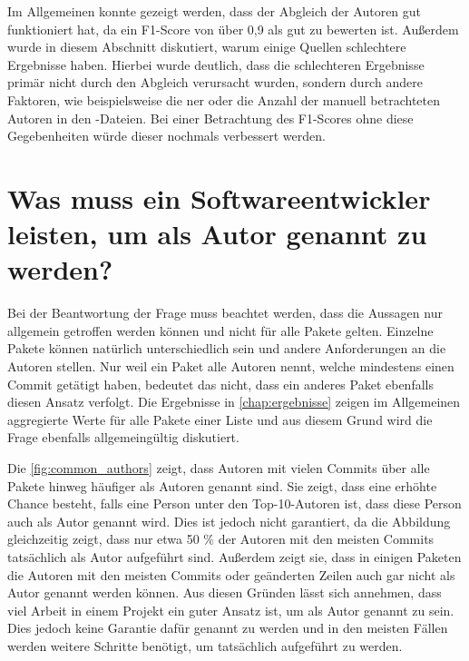 Im Allgemeinen konnte gezeigt werden, dass der Abgleich der Autoren gut funktioniert hat, da ein F1-Score von über 0,9 als gut zu bewerten ist.
Außerdem wurde in diesem Abschnitt diskutiert, warum einige Quellen schlechtere Ergebnisse haben.
Hierbei wurde deutlich, dass die schlechteren Ergebnisse primär nicht durch den Abgleich verursacht wurden, sondern durch andere Faktoren, wie beispielsweise die \gls{ner} oder die Anzahl der manuell betrachteten Autoren in den -Dateien.
Bei einer Betrachtung des F1-Scores ohne diese Gegebenheiten würde dieser nochmals verbessert werden.

\section{Was muss ein Softwareentwickler leisten, um als Autor genannt zu werden?}
\label{sec:zitationsfaehiger_autor_diskussion}
Bei der Beantwortung der Frage muss beachtet werden, dass die Aussagen nur allgemein getroffen werden können und nicht für alle Pakete gelten.
Einzelne Pakete können natürlich unterschiedlich sein und andere Anforderungen an die Autoren stellen.
Nur weil ein Paket alle Autoren nennt, welche mindestens einen Commit getätigt haben, bedeutet das nicht, dass ein anderes Paket ebenfalls diesen Ansatz verfolgt.
Die Ergebnisse in \autoref{chap:ergebnisse} zeigen im Allgemeinen aggregierte Werte für alle Pakete einer Liste und aus diesem Grund wird die Frage ebenfalls allgemeingültig diskutiert.

Die \autoref{fig:common_authors} zeigt, dass Autoren mit vielen Commits über alle Pakete hinweg häufiger als Autoren genannt sind.
Sie zeigt, dass eine erhöhte Chance besteht, falls eine Person unter den Top-10-Autoren ist, dass diese Person auch als Autor genannt wird.
Dies ist jedoch nicht garantiert, da die Abbildung gleichzeitig zeigt, dass nur etwa 50 \% der Autoren mit den meisten Commits tatsächlich als Autor aufgeführt sind.
Außerdem zeigt sie, dass in einigen Paketen die Autoren mit den meisten Commits oder geänderten Zeilen auch gar nicht als Autor genannt werden können.
Aus diesen Gründen lässt sich annehmen, dass viel Arbeit in einem Projekt ein guter Ansatz ist, um als Autor genannt zu sein.
Dies jedoch keine Garantie dafür genannt zu werden und in den meisten Fällen werden weitere Schritte benötigt, um tatsächlich aufgeführt zu werden.

